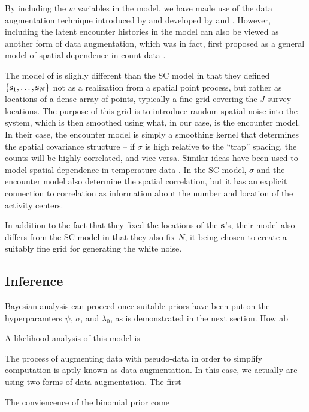 By including the $w$ variables in the model, we have made use of the
data augmentation technique introduced by \citet{royle_etal:2007} and
developed by \citep{royle:2009} and
\citep{royle_dorazio:2010}. However, including the latent encounter
histories in the model can also be viewed as another form of data
augmentation, which was in fact, first proposed as a general model of
spatial dependence in count data
\citep{wolpert_ickstadt:1998}.

The model of
\citet{wolpert_ickstadt:1998} is slighly different than the SC model
in that they defined $\{{\bf s}_1, \ldots, {\bf s}_N\}$ not as a
realization from a spatial point process, but rather as locations of a
dense array of points, typically a fine grid covering the $J$ survey
locations. The purpose of this grid is to introduce random spatial noise into the system,
which is then smoothed using what, in our case, is the encounter
model. In their case, the encounter model is simply a smoothing
kernel that determines the spatial covariance structure -- if $\sigma$
is high relative to the ``trap'' spacing, the counts will be highly
correlated, and vice versa. Similar ideas have been used to model
spatial dependence in temperature data \citep{higdon:1998}. In the SC
model, $\sigma$ and the encounter model also determine the spatial
correlation, but it has an explicit connection to
correlation as information about the number and location of the
activity centers.

In addition to the fact that they fixed
the locations of the $\bf s$'s, their model also differs from the SC
model in that they also fix $N$, it being chosen to create a suitably
fine grid for generating the white noise.



\subsection{Inference}

Bayesian analysis can proceed once suitable priors have been put on
the hyperparamters $\psi$, $\sigma$, and $\lambda_0$, as is
demonstrated in the next section. How ab

A likelihood analysis of this model is

The process of augmenting data with pseudo-data in order to simplify
computation is aptly known as data augmentation. In this case, we
actually are using two forms of data augmentation. The first

The conviencence of the binomial prior come



